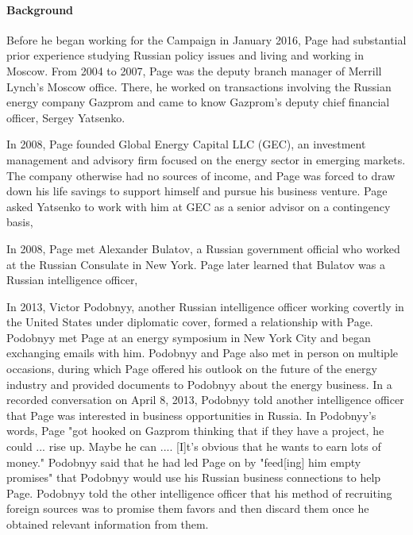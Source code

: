\paragraph{Background}

Before he began working for the Campaign in January 2016, Page had substantial prior experience studying Russian policy issues and living and working in Moscow.
From 2004 to 2007, Page was the deputy branch manager of Merrill Lynch's Moscow office.%
There, he worked on transactions involving the Russian energy company Gazprom and came to know Gazprom's deputy chief financial officer, Sergey Yatsenko.%

In 2008, Page founded Global Energy Capital LLC (GEC), an investment management and advisory firm focused on the energy sector in emerging markets.%
The company otherwise had no sources of income, and Page was forced to draw down his life savings to support himself and pursue his business venture.%
Page asked Yatsenko to work with him at GEC as a senior advisor on a contingency basis,

In 2008, Page met Alexander Bulatov, a Russian government official who worked at the Russian Consulate in New York.%
Page later learned that Bulatov was a Russian intelligence officer,

In 2013, Victor Podobnyy, another Russian intelligence officer working covertly in the United States under diplomatic cover, formed a relationship with Page.%
Podobnyy met Page at an energy symposium in New York City and began exchanging emails with him.%
Podobnyy and Page also met in person on multiple occasions, during which Page offered his outlook on the future of the energy industry and provided documents to Podobnyy about the energy business. %
In a recorded conversation on April 8, 2013, Podobnyy told another intelligence officer that Page was interested in business opportunities in Russia.%
In Podobnyy's words, Page "got hooked on Gazprom thinking that if they have a project, he could ... rise up. Maybe he can .... [I]t's obvious that he wants to earn lots of money."%
Podobnyy said that he had led Page on by "feed[ing] him empty promises" that Podobnyy would use his Russian business connections to help Page.%
Podobnyy told the other intelligence officer that his method of recruiting foreign sources was to promise them favors and then discard them once he obtained relevant information from them.%

